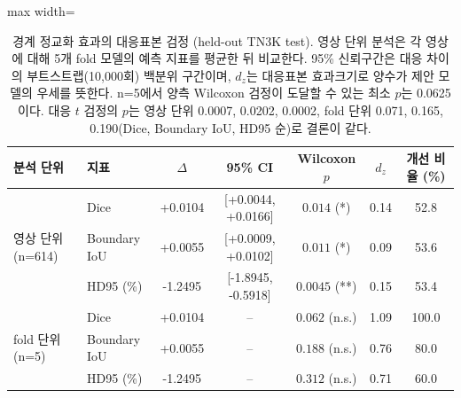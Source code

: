 \begin{table}[htbp]
\centering
\footnotesize
\caption[경계 정교화 효과의 대응표본 검정 (held-out TN3K test).]{경계 정교화 효과의 대응표본 검정 (held-out TN3K test). 영상 단위 분석은 각 영상에 대해 5개 fold 모델의 예측 지표를 평균한 뒤 비교한다. 95\% 신뢰구간은 대응 차이의 부트스트랩(10,000회) 백분위 구간이며, $d_z$는 대응표본 효과크기로 양수가 제안 모델의 우세를 뜻한다. n=5에서 양측 Wilcoxon 검정이 도달할 수 있는 최소 $p$는 0.0625이다. 대응 $t$ 검정의 $p$는 영상 단위 0.0007, 0.0202, 0.0002, fold 단위 0.071, 0.165, 0.190(Dice, Boundary IoU, HD95 순)로 결론이 같다.}
\label{tab:stats}
\setlength{\tabcolsep}{4pt}
\begin{adjustbox}{max width=\linewidth}
\begin{tabular}{llccccc}
\toprule
분석 단위 & 지표 & $\Delta$ & 95\% CI & Wilcoxon $p$ & $d_z$ & 개선 비율 (\%) \\
\midrule
\multirow{3}{*}{영상 단위 (n=614)} & Dice & +0.0104 & [+0.0044, +0.0166] & $0.014$ (*) & 0.14 & 52.8 \\
 & Boundary IoU & +0.0055 & [+0.0009, +0.0102] & $0.011$ (*) & 0.09 & 53.6 \\
 & HD95 (\%) & -1.2495 & [-1.8945, -0.5918] & $0.0045$ (**) & 0.15 & 53.4 \\
\midrule
\multirow{3}{*}{fold 단위 (n=5)} & Dice & +0.0104 & -- & $0.062$ (n.s.) & 1.09 & 100.0 \\
 & Boundary IoU & +0.0055 & -- & $0.188$ (n.s.) & 0.76 & 80.0 \\
 & HD95 (\%) & -1.2495 & -- & $0.312$ (n.s.) & 0.71 & 60.0 \\
\bottomrule
\end{tabular}
\end{adjustbox}
\end{table}
